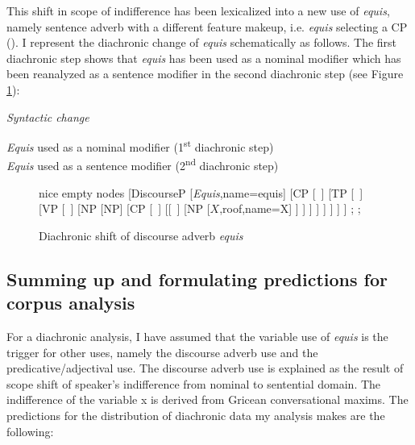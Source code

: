 \documentclass[output=paper]{langsci/langscibook}
\begin{document}
This shift in scope of indifference has been lexicalized into a new use of \textit{equis}, namely sentence adverb with a different feature makeup, i.e. \textit{equis} selecting a CP (). I represent the diachronic change of \textit{equis} schematically as follows. The first diachronic step shows that \textit{equis} has been used as a nominal modifier which has been reanalyzed as a sentence modifier in the second diachronic step (see Figure \ref{fig:kellert:tree4n}):

\ea\label{ex:kellert:66} \textit{Syntactic change}\\
\begin{xlist}
\ex	\textit{Equis} used as a nominal modifier (1\textsuperscript{st} diachronic step)\\
\ex	\textit{Equis} used as a sentence modifier (2\textsuperscript{nd} diachronic step)\\
\end{xlist}
\z

\begin{figure}
	\caption{Diachronic shift of discourse adverb \textit{equis}\label{fig:kellert:tree4n}}
	\begin{forest} nice empty nodes
	[DiscourseP
	[\textit{Equis},name=equis] [CP
	[~] [TP
	[~] [VP
	[~] [NP
	[NP] [CP
	[~] [[~] [NP
	[$X$,roof,name=X]
	]
	]
	]
	]
	]
	]
	]
	]
	;
	;
\end{forest}
\end{figure}

\subsection{Summing up and formulating predictions for corpus analysis}\label{sec:kellert:4.3}
For a diachronic analysis, I have assumed that the variable use of \textit{equis} is the trigger for other uses, namely the discourse adverb use and the predicative/adjectival use. The discourse adverb use is explained as the result of scope shift of speaker’s indifference from nominal to sentential domain. The indifference of the variable x is derived from Gricean conversational maxims. The predictions for the distribution of diachronic data my analysis makes are the following:
\end{document}
